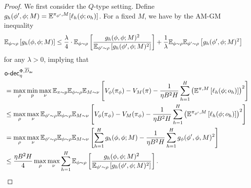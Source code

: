 \begin{proof}
    We first consider the $Q$-type setting.  Define $g_h(\phi', \phi; M) = \mathbb{E}^{\pi_{\phi'}, M}[\ell_h(\phi; o_h)]$. 
    For a fixed $M$, we have by the AM-GM inequality  
    \begin{align*}
        \E_{\phi\sim \rho} \left[g_h(\phi, \phi; M)\right] 
        &\leq  \frac{\lambda}{4}\cdot \E_{\phi\sim \rho} \left[\frac{g_h(\phi, \phi; M)^2}{\E_{\phi'\sim \rho} \left[g_h(\phi', \phi; M)^2\right]}\right] + \frac{1}{\lambda}\E_{\phi\sim \rho}\E_{\phi'\sim \rho} \left[g_h(\phi', \phi; M)^2\right]  %
    \end{align*}
    for any $\lambda>0$, 
    implying that 
    \begin{align*}
        &\mathsf{o}\text{-}\mathsf{dec}_\eta^{\Phi, \overline{D}_{\mathsf{av}}} \\
        &=\max_\rho \min_p \max_\nu \mathbb{E}_{\pi\sim p}\mathbb{E}_{\phi\sim \rho} \mathbb{E}_{M\sim \nu} \left[V_\phi(\pi_\phi) - V_M(\pi) - \frac{1}{\eta B^2 H} \sum_{h=1}^H \left(\mathbb{E}^{\pi, M}\left[\ell_h(\phi; o_h)\right]\right)^2\right]  \\ 
        &\leq \max_\rho \max_\nu \mathbb{E}_{\phi'\sim \rho}\mathbb{E}_{\phi\sim \rho} \mathbb{E}_{M\sim \nu} \left[V_\phi(\pi_\phi) - V_M(\pi_\phi) - \frac{1}{\eta B^2 H} \sum_{h=1}^H \left(\mathbb{E}^{\pi_{\phi'}, M}\left[\ell_h(\phi; o_h)\right]\right)^2\right]  \\
        &=\max_\rho \max_\nu \mathbb{E}_{\phi'\sim \rho} \mathbb{E}_{\phi\sim \rho} \mathbb{E}_{M\sim \nu}\left[\sum_{h=1}^H g_h(\phi, \phi; M) - \frac{1}{\eta B^2 H} \sum_{h=1}^H  g_\phi(\phi', \phi, M)^2\right] \\
        &\leq \frac{\eta B^2 H}{4} \max_{\rho}\max_\nu \sum_{h=1}^H  \mathbb{E}_{\phi\sim \rho} \left[\frac{g_h(\phi, \phi; M)^2}{\mathbb{E}_{\phi'\sim \rho} \left[g_h(\phi', \phi; M)^2\right]}\right]. 
    \end{align*}

\end{proof}

